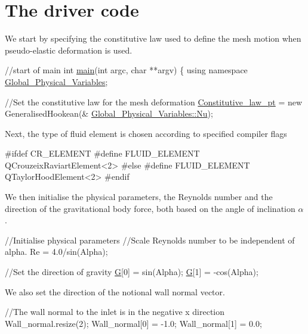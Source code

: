  \hypertarget{index_main}{}\section{The driver code}\label{index_main}
We start by specifying the constitutive law used to define the mesh motion when pseudo-\/elastic deformation is used. 
\begin{DoxyCodeInclude}
\textcolor{comment}{//start of main}
\textcolor{keywordtype}{int} \hyperlink{inclined__plane_8cc_a3c04138a5bfe5d72780bb7e82a18e627}{main}(\textcolor{keywordtype}{int} argc, \textcolor{keywordtype}{char} **argv)
\{
 \textcolor{keyword}{using namespace }\hyperlink{namespaceGlobal__Physical__Variables}{Global\_Physical\_Variables};
 
 \textcolor{comment}{//Set the constitutive law for the mesh deformation}
 \hyperlink{namespaceGlobal__Physical__Variables_a2a37fb040c832ee7a086bb13bb02a100}{Constitutive\_law\_pt}  = \textcolor{keyword}{new} GeneralisedHookean(&
      \hyperlink{namespaceGlobal__Physical__Variables_a3962c36313826b19f216f6bbbdd6a477}{Global\_Physical\_Variables::Nu});

\end{DoxyCodeInclude}
 Next, the type of fluid element is chosen according to specified compiler flags 
\begin{DoxyCodeInclude}
\textcolor{preprocessor}{#ifdef CR\_ELEMENT}
\textcolor{preprocessor}{#define FLUID\_ELEMENT QCrouzeixRaviartElement<2>}
\textcolor{preprocessor}{#else}
\textcolor{preprocessor}{#define FLUID\_ELEMENT QTaylorHoodElement<2>}
\textcolor{preprocessor}{#endif }

\end{DoxyCodeInclude}
 We then initialise the physical parameters, the Reynolds number and the direction of the gravitational body force, both based on the angle of inclination $\alpha$. 
\begin{DoxyCodeInclude}
 \textcolor{comment}{//Initialise physical parameters}
 \textcolor{comment}{//Scale Reynolds number to be independent of alpha.}
 Re = 4.0/sin(Alpha); 

 \textcolor{comment}{//Set the direction of gravity}
 \hyperlink{namespaceGlobal__Physical__Variables_aa868968dead376240a69f9152bd599b9}{G}[0] = sin(Alpha);
 \hyperlink{namespaceGlobal__Physical__Variables_aa868968dead376240a69f9152bd599b9}{G}[1] = -cos(Alpha);

\end{DoxyCodeInclude}
 We also set the direction of the notional wall normal vector. 
\begin{DoxyCodeInclude}

 \textcolor{comment}{//The wall normal to the inlet is in the negative x direction}
 Wall\_normal.resize(2);
 Wall\_normal[0] = -1.0;
 Wall\_normal[1] = 0.0;

\end{DoxyCodeInclude}


